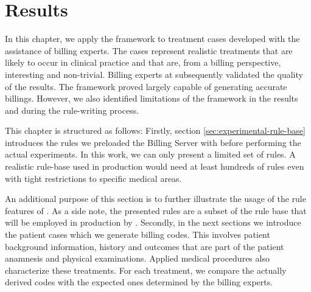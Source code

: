 \chapter{Results}\label{ch:results}
In this chapter, we apply the framework to treatment cases developed with the assistance of billing experts.
The cases represent realistic treatments that are likely to occur in clinical practice and that are, from a billing perspective, interesting and non-trivial.
Billing experts at \AV subsequently validated the quality of the results.
The framework proved largely capable of generating accurate billings.
However, we also identified limitations of the framework in the results and during the rule-writing process.

This chapter is structured as follows:
Firstly, section \ref{sec:experimental-rule-base} introduces the rules we preloaded the Billing Server with before performing the actual experiments.
In this work, we can only present a limited set of rules.
A realistic rule-base used in production would need at least hundreds of rules even with tight restrictions to specific medical areas.

An additional purpose of this section is to further illustrate the usage of the rule features of \RL.
As a side note, the presented rules are a subset of the rule base that will be employed in production by \AV.
Secondly, in the next sections we introduce the patient cases which we generate billing codes.
This involves patient background information, history and outcomes that are part of the patient anamnesis and physical examinations.
Applied medical procedures also characterize these treatments.
For each treatment, we compare the actually derived codes with the expected ones determined by the billing experts.



%
